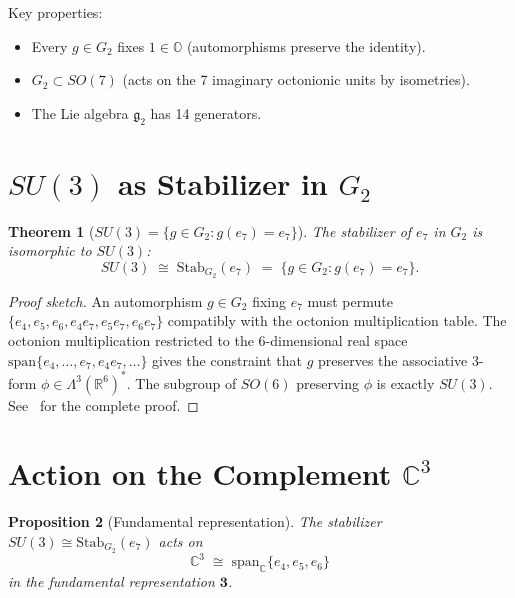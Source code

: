 \documentclass[12pt,a4paper]{article}
\newtheorem{theorem}{Theorem}[section]
\newtheorem{proposition}[theorem]{Proposition}
\theoremstyle{definition}
\theoremstyle{remark}
\begin{document}
Key properties:
\begin{itemize}
  \item Every $g\in G_2$ fixes $1 \in \mathbb{O}$ (automorphisms preserve the identity).
  \item $G_2 \subset SO(7)$ (acts on the 7 imaginary octonionic units by isometries).
  \item The Lie algebra $\mathfrak{g}_2$ has 14 generators.
\end{itemize}

\section{$SU(3)$ as Stabilizer in $G_2$}
\label{sec:su3stab}

\begin{theorem}[$SU(3) = \{g\in G_2 : g(e_7) = e_7\}$]
\label{thm:su3stab}
The stabilizer of $e_7$ in $G_2$ is isomorphic to $SU(3)$:
\begin{equation}
  SU(3) \;\cong\; \mathrm{Stab}_{G_2}(e_7)
         \;=\; \{g\in G_2 : g(e_7) = e_7\}.
\end{equation}
\end{theorem}

\begin{proof}[Proof sketch]
An automorphism $g\in G_2$ fixing $e_7$ must permute
$\{e_4, e_5, e_6, e_4e_7, e_5e_7, e_6e_7\}$ compatibly with the
octonion multiplication table.  The octonion multiplication restricted
to the 6-dimensional real space $\mathrm{span}\{e_4,\ldots,e_7,e_4e_7,\ldots\}$
gives the constraint that $g$ preserves the associative 3-form
$\phi \in \Lambda^3(\mathbb{R}^6)^*$.  The subgroup of $SO(6)$
preserving $\phi$ is exactly $SU(3)$.  See~\cite{Baez2002} for the
complete proof.
\end{proof}

\section{Action on the Complement $\mathbb{C}^3$}
\label{sec:action}

\begin{proposition}[Fundamental representation]
\label{prop:fund}
The stabilizer $SU(3) \cong \mathrm{Stab}_{G_2}(e_7)$ acts on
\begin{equation}
  \mathbb{C}^3 \;\cong\; \mathrm{span}_\mathbb{C}\{e_4, e_5, e_6\}
\end{equation}
in the fundamental representation $\mathbf{3}$.
\end{proposition}
\end{document}
